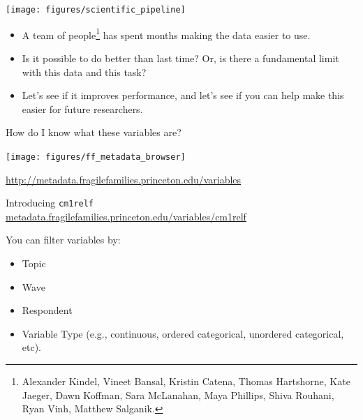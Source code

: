\documentclass{beamer}
\begin{document}
\begin{frame}

\begin{center}
\texttt{[image: figures/scientific\_pipeline]}
\end{center}

\end{frame}
\begin{frame}

\begin{itemize}
\item A team of people\footnote{Alexander Kindel, Vineet Bansal, Kristin Catena, Thomas Hartshorne, Kate Jaeger, Dawn Koffman, Sara McLanahan, Maya Phillips, Shiva Rouhani, Ryan Vinh, Matthew Salganik.} has spent months making the data easier to use. \pause
\item Is it possible to do better than last time? Or, is there a fundamental limit with this data and this task? \pause
\item Let's see if it improves performance, \pause and let's see if you can help make this easier for future researchers.
\end{itemize}

\end{frame}
\begin{frame}

How do I know what these variables are? 

\begin{center}
\texttt{[image: figures/ff\_metadata\_browser]}
\end{center}

\vfill

\url{http://metadata.fragilefamilies.princeton.edu/variables}

\end{frame}
\begin{frame}

Introducing \texttt{cm1relf}\\

\url{metadata.fragilefamilies.princeton.edu/variables/cm1relf}

\end{frame}
\begin{frame}

You can filter variables by:
\begin{itemize}
\item Topic
\item Wave
\item Respondent
\item Variable Type (e.g., continuous, ordered categorical, unordered categorical, etc).
\end{itemize}

\end{frame}	
\end{document}
